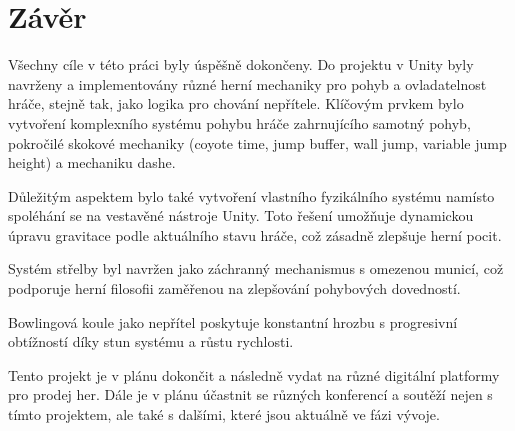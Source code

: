 \chapter*{Závěr}
Všechny cíle v této práci byly úspěšně dokončeny. Do projektu v Unity byly navrženy a implementovány různé herní mechaniky pro pohyb a ovladatelnost hráče, stejně tak, jako logika pro chování nepřítele. Klíčovým prvkem bylo vytvoření komplexního systému pohybu hráče zahrnujícího samotný pohyb, pokročilé skokové mechaniky (coyote time, jump buffer, wall jump, variable jump height) a mechaniku dashe.

Důležitým aspektem bylo také vytvoření vlastního fyzikálního systému namísto spoléhání se na vestavěné nástroje Unity. Toto řešení umožňuje dynamickou úpravu gravitace podle aktuálního stavu hráče, což zásadně zlepšuje herní pocit.

Systém střelby byl navržen jako záchranný mechanismus s omezenou municí, což podporuje herní filosofii zaměřenou na zlepšování pohybových dovedností.

Bowlingová koule jako nepřítel poskytuje konstantní hrozbu s progresivní obtížností díky stun systému a růstu rychlosti.

Tento projekt je v plánu dokončit a následně vydat na různé digitální platformy pro prodej her. Dále je v plánu účastnit se různých konferencí a soutěží nejen s tímto projektem, ale také s dalšími, které jsou aktuálně ve fázi vývoje.